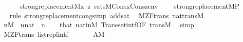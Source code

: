 \begin{isabellebody}
\ \ \isanewline
\ \ \ \ {\isachardoublequoteopen}strong{\isacharunderscore}{\kern0pt}replacement{\isacharparenleft}{\kern0pt}{\isacharhash}{\kern0pt}{\isacharhash}{\kern0pt}M{\isacharcomma}{\kern0pt}{\isasymlambda}x\ z{\isachardot}{\kern0pt}\ sats{\isacharparenleft}{\kern0pt}M{\isacharcomma}{\kern0pt}{\isasymphi}{\isacharcomma}{\kern0pt}Cons{\isacharparenleft}{\kern0pt}x{\isacharcomma}{\kern0pt}Cons{\isacharparenleft}{\kern0pt}z{\isacharcomma}{\kern0pt}env{\isacharparenright}{\kern0pt}{\isacharparenright}{\kern0pt}{\isacharparenright}{\kern0pt}{\isacharparenright}{\kern0pt}\ {\isasymlongleftrightarrow}\isanewline
\ \ \ strong{\isacharunderscore}{\kern0pt}replacement{\isacharparenleft}{\kern0pt}{\isacharhash}{\kern0pt}{\isacharhash}{\kern0pt}M{\isacharcomma}{\kern0pt}P{\isacharparenright}{\kern0pt}{\isachardoublequoteclose}\isanewline
%
\isadelimproof
\ \ %
\endisadelimproof
%
\isatagproof
{}\isamarkupfalse%
\ {\isacharparenleft}{\kern0pt}rule\ strong{\isacharunderscore}{\kern0pt}replacement{\isacharunderscore}{\kern0pt}cong{\isacharcomma}{\kern0pt}simp\ add{\isacharcolon}{\kern0pt}sat{\isacharparenright}{\kern0pt}%
\endisatagproof
{\isafoldproof}%
%
\isadelimproof
\isanewline
%
\endisadelimproof
\isanewline
{}\isamarkupfalse%
\ {\isacharparenleft}{\kern0pt}\ M{\isacharunderscore}{\kern0pt}ZF{\isacharunderscore}{\kern0pt}trans{\isacharparenright}{\kern0pt}\ nat{\isacharunderscore}{\kern0pt}trans{\isacharunderscore}{\kern0pt}M\ {\isacharcolon}{\kern0pt}\isanewline
\ \ {\isachardoublequoteopen}n{\isasymin}M{\isachardoublequoteclose}\ \ {\isachardoublequoteopen}n{\isasymin}nat{\isachardoublequoteclose}\ \ n\isanewline
%
\isadelimproof
\ \ %
\endisadelimproof
%
\isatagproof
{}\isamarkupfalse%
\ that\ nat{\isacharunderscore}{\kern0pt}in{\isacharunderscore}{\kern0pt}M\ Transset{\isacharunderscore}{\kern0pt}intf{\isacharbrackleft}{\kern0pt}OF\ trans{\isacharunderscore}{\kern0pt}M{\isacharbrackright}{\kern0pt}\ \isamarkupfalse%
\ simp%
\endisatagproof
{\isafoldproof}%
%
\isadelimproof
\isanewline
%
\endisadelimproof
\isanewline
{}\isamarkupfalse%
\ {\isacharparenleft}{\kern0pt}\ M{\isacharunderscore}{\kern0pt}ZF{\isacharunderscore}{\kern0pt}trans{\isacharparenright}{\kern0pt}\ list{\isacharunderscore}{\kern0pt}repl{}{\isacharunderscore}{\kern0pt}intf{\isacharcolon}{\kern0pt}\isanewline
\ \ \isanewline
\ \ \ \ {\isachardoublequoteopen}A{\isasymin}M{\isachardoublequoteclose}\isanewline

\end{isabellebody}
